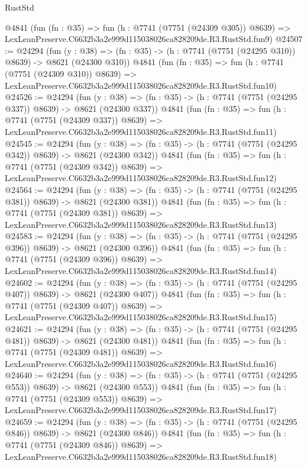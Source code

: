 \begin{lexlean}{RustStd}
\begin{coremodule}
    @4841
    (fun (fn : @35) =>
    fun (h : @7741 (@7751 (@24309 @305)) @8639) =>
    LexLeanPreserve.C6632b3a2e999d115038026ca828209de.R3.RustStd.fun9)
@24507 := @24294
    (fun (y : @38) => (fn : @35) -> (h : @7741 (@7751 (@24295 @310)) @8639) -> @8621 (@24300 @310))
    @4841
    (fun (fn : @35) =>
    fun (h : @7741 (@7751 (@24309 @310)) @8639) =>
    LexLeanPreserve.C6632b3a2e999d115038026ca828209de.R3.RustStd.fun10)
@24526 := @24294
    (fun (y : @38) => (fn : @35) -> (h : @7741 (@7751 (@24295 @337)) @8639) -> @8621 (@24300 @337))
    @4841
    (fun (fn : @35) =>
    fun (h : @7741 (@7751 (@24309 @337)) @8639) =>
    LexLeanPreserve.C6632b3a2e999d115038026ca828209de.R3.RustStd.fun11)
@24545 := @24294
    (fun (y : @38) => (fn : @35) -> (h : @7741 (@7751 (@24295 @342)) @8639) -> @8621 (@24300 @342))
    @4841
    (fun (fn : @35) =>
    fun (h : @7741 (@7751 (@24309 @342)) @8639) =>
    LexLeanPreserve.C6632b3a2e999d115038026ca828209de.R3.RustStd.fun12)
@24564 := @24294
    (fun (y : @38) => (fn : @35) -> (h : @7741 (@7751 (@24295 @381)) @8639) -> @8621 (@24300 @381))
    @4841
    (fun (fn : @35) =>
    fun (h : @7741 (@7751 (@24309 @381)) @8639) =>
    LexLeanPreserve.C6632b3a2e999d115038026ca828209de.R3.RustStd.fun13)
@24583 := @24294
    (fun (y : @38) => (fn : @35) -> (h : @7741 (@7751 (@24295 @396)) @8639) -> @8621 (@24300 @396))
    @4841
    (fun (fn : @35) =>
    fun (h : @7741 (@7751 (@24309 @396)) @8639) =>
    LexLeanPreserve.C6632b3a2e999d115038026ca828209de.R3.RustStd.fun14)
@24602 := @24294
    (fun (y : @38) => (fn : @35) -> (h : @7741 (@7751 (@24295 @407)) @8639) -> @8621 (@24300 @407))
    @4841
    (fun (fn : @35) =>
    fun (h : @7741 (@7751 (@24309 @407)) @8639) =>
    LexLeanPreserve.C6632b3a2e999d115038026ca828209de.R3.RustStd.fun15)
@24621 := @24294
    (fun (y : @38) => (fn : @35) -> (h : @7741 (@7751 (@24295 @481)) @8639) -> @8621 (@24300 @481))
    @4841
    (fun (fn : @35) =>
    fun (h : @7741 (@7751 (@24309 @481)) @8639) =>
    LexLeanPreserve.C6632b3a2e999d115038026ca828209de.R3.RustStd.fun16)
@24640 := @24294
    (fun (y : @38) => (fn : @35) -> (h : @7741 (@7751 (@24295 @553)) @8639) -> @8621 (@24300 @553))
    @4841
    (fun (fn : @35) =>
    fun (h : @7741 (@7751 (@24309 @553)) @8639) =>
    LexLeanPreserve.C6632b3a2e999d115038026ca828209de.R3.RustStd.fun17)
@24659 := @24294
    (fun (y : @38) => (fn : @35) -> (h : @7741 (@7751 (@24295 @846)) @8639) -> @8621 (@24300 @846))
    @4841
    (fun (fn : @35) =>
    fun (h : @7741 (@7751 (@24309 @846)) @8639) =>
    LexLeanPreserve.C6632b3a2e999d115038026ca828209de.R3.RustStd.fun18)

\end{coremodule}
\end{lexlean}
